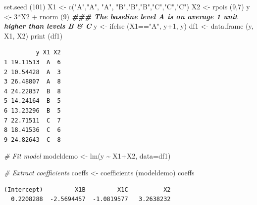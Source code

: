 \documentclass[
  oneside]{krantz}
\newenvironment{Shaded}{\begin{snugshade}}{\end{snugshade}}
\newcommand{\AttributeTok}[1]{\textcolor[rgb]{0.77,0.63,0.00}{#1}}
\newcommand{\CommentTok}[1]{\textcolor[rgb]{0.56,0.35,0.01}{\textit{#1}}}
\newcommand{\DecValTok}[1]{\textcolor[rgb]{0.00,0.00,0.81}{#1}}
\newcommand{\DocumentationTok}[1]{\textcolor[rgb]{0.56,0.35,0.01}{\textbf{\textit{#1}}}}
\newcommand{\FunctionTok}[1]{\textcolor[rgb]{0.00,0.00,0.00}{#1}}
\newcommand{\NormalTok}[1]{#1}
\newcommand{\OtherTok}[1]{\textcolor[rgb]{0.56,0.35,0.01}{#1}}
\newcommand{\SpecialCharTok}[1]{\textcolor[rgb]{0.00,0.00,0.00}{#1}}
\newcommand{\StringTok}[1]{\textcolor[rgb]{0.31,0.60,0.02}{#1}}
\begin{document}
\begin{Shaded}
\begin{Highlighting}[]
\FunctionTok{set.seed}\NormalTok{ (}\DecValTok{101}\NormalTok{)}
\NormalTok{X1 }\OtherTok{\textless{}{-}} \FunctionTok{c}\NormalTok{(}\StringTok{"A"}\NormalTok{,}\StringTok{"A"}\NormalTok{, }\StringTok{"A"}\NormalTok{, }\StringTok{"B"}\NormalTok{,}\StringTok{"B"}\NormalTok{,}\StringTok{"B"}\NormalTok{,}\StringTok{"C"}\NormalTok{,}\StringTok{"C"}\NormalTok{,}\StringTok{"C"}\NormalTok{)}
\NormalTok{X2 }\OtherTok{\textless{}{-}} \FunctionTok{rpois}\NormalTok{ (}\DecValTok{9}\NormalTok{,}\DecValTok{7}\NormalTok{) }
\NormalTok{y }\OtherTok{\textless{}{-}} \DecValTok{3}\SpecialCharTok{*}\NormalTok{X2 }\SpecialCharTok{+} \FunctionTok{rnorm}\NormalTok{ (}\DecValTok{9}\NormalTok{)}
\DocumentationTok{\#\#\# The baseline level A is on average 1 unit higher than levels B \& C}
\NormalTok{y }\OtherTok{\textless{}{-}} \FunctionTok{ifelse}\NormalTok{ (X1}\SpecialCharTok{==}\StringTok{"A"}\NormalTok{, y}\SpecialCharTok{+}\DecValTok{1}\NormalTok{, y) }
\NormalTok{df1 }\OtherTok{\textless{}{-}} \FunctionTok{data.frame}\NormalTok{ (y, X1, X2)}
\FunctionTok{print}\NormalTok{ (df1)}
\end{Highlighting}
\end{Shaded}

\begin{verbatim}
         y X1 X2
1 19.11513  A  6
2 10.54428  A  3
3 26.48807  A  8
4 24.22837  B  8
5 14.24164  B  5
6 13.23296  B  5
7 22.71511  C  7
8 18.41536  C  6
9 24.82643  C  8
\end{verbatim}

\begin{Shaded}
\begin{Highlighting}[]
\CommentTok{\# Fit model }
\NormalTok{modeldemo }\OtherTok{\textless{}{-}} \FunctionTok{lm}\NormalTok{(y }\SpecialCharTok{\textasciitilde{}}\NormalTok{ X1}\SpecialCharTok{+}\NormalTok{X2, }\AttributeTok{data=}\NormalTok{df1)}

\CommentTok{\# Extract coefficients}
\NormalTok{coeffs }\OtherTok{\textless{}{-}} \FunctionTok{coefficients}\NormalTok{ (modeldemo)}
\NormalTok{coeffs}
\end{Highlighting}
\end{Shaded}

\begin{verbatim}
(Intercept)         X1B         X1C          X2 
  0.2208288  -2.5694457  -1.0819577   3.2638232 
\end{verbatim}
\end{document}
